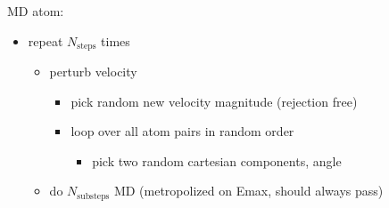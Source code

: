 \documentclass{article}
\begin{document}
\vspace*{\baselineskip}
MD atom:
\begin{itemize}
   \item repeat $N_\mathrm{steps}$ times
   \begin{itemize}
      \item perturb velocity
      \begin{itemize}
	 \item pick random new velocity magnitude (rejection free)
	 \item loop over all atom pairs in random order
	 \begin{itemize}
	    \item pick two random cartesian components, angle
	 \end{itemize}
      \end{itemize}
      \item do $N_\mathrm{substeps}$ MD (metropolized on Emax, should always pass)
   \end{itemize}
\end{itemize}
\end{document}
